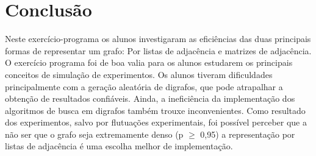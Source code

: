 \documentclass[brazil,times]{abnt}
\begin{document}
\section*{Conclusão}
Neste exercício-programa os alunos investigaram as eficiências das duas principais formas de representar um grafo: Por listas de adjacência e matrizes de adjacência. O exercício programa foi de boa valia para os alunos estudarem os principais conceitos de simulação de experimentos. Os alunos tiveram dificuldades principalmente com a geração aleatória de digrafos, que pode atrapalhar a obtenção de resultados confiáveis. Ainda, a ineficiência da implementação dos algoritmos de busca em digrafos também trouxe inconvenientes.  Como resultado dos experimentos, salvo por flutuações experimentais, foi possível perceber que a não ser que o grafo seja extremamente denso (p $\ge$ 0,95) a representação por listas de adjacência é uma escolha melhor de implementação. 
%
%
\end{document}

